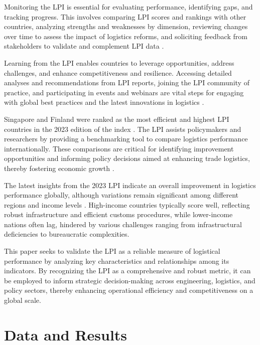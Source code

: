 \documentclass[sigconf]{acmart}
\begin{document}
Monitoring the LPI is essential for evaluating performance, identifying gaps, and tracking progress. This involves comparing LPI scores and rankings with other countries, analyzing strengths and weaknesses by dimension, reviewing changes over time to assess the impact of logistics reforms, and soliciting feedback from stakeholders to validate and complement LPI data \cite{WBreport2018}.

Learning from the LPI enables countries to leverage opportunities, address challenges, and enhance competitiveness and resilience. Accessing detailed analyses and recommendations from LPI reports, joining the LPI community of practice, and participating in events and webinars are vital steps for engaging with global best practices and the latest innovations in logistics \cite{worldbank4}.

Singapore and Finland were ranked as the most efficient and highest LPI countries in the 2023 edition of the index \cite{worldbank4}. The LPI assists policymakers and researchers by providing a benchmarking tool to compare logistics performance internationally. These comparisons are critical for identifying improvement opportunities and informing policy decisions aimed at enhancing trade logistics, thereby fostering economic growth \cite{arvis2023}.

The latest insights from the 2023 LPI indicate an overall improvement in logistics performance globally, although variations remain significant among different regions and income levels \cite{arvis2023}. High-income countries typically score well, reflecting robust infrastructure and efficient customs procedures, while lower-income nations often lag, hindered by various challenges ranging from infrastructural deficiencies to bureaucratic complexities.

This paper seeks to validate the LPI as a reliable measure of logistical performance by analyzing key characteristics and relationships among its indicators. By recognizing the LPI as a comprehensive and robust metric, it can be employed to inform strategic decision-making across engineering, logistics, and policy sectors, thereby enhancing operational efficiency and competitiveness on a global scale.
\section{Data and Results}
\end{document}

